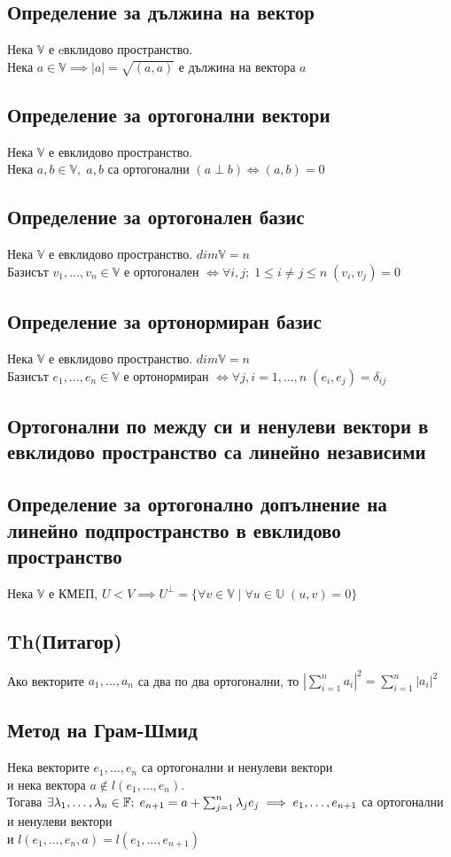 \documentclass{article}
\newcommand{\V}{\mathbb{V}}
\newcommand{\F}{\mathbb{F}}
\newcommand{\UV}{\mathbb{U}}
\newcommand{\n}[1]{#1_1, \dots, #1_n}
\newcommand{\nplusone}[1]{#1_1, \dots, #1_{n + 1}}
\newcommand{\ieqn}{i = 1, \dots, n}
\newcommand{\forallij}{\forall i, j; \; 1 \leq i \neq j \leq n}
\begin{document}
    \subsection{Определение за дължина на вектор}
    Нека \(\V\) е eвклидово пространство.\\
    Нека \(a \in \V \implies |a| = \sqrt{(a, a)}\) е дължина на вектора \(a\)
    \subsection{Определение за ортогонални вектори}
    Нека \(\V\) е евклидово пространство.\\
    Нека \(a, b \in \V, \; a, b\) са ортогонални \((a \perp b) \iff (a, b) = 0 \;\)
    \subsection{Определение за ортогонален базис}
    Нека \(\V\) е евклидово пространство. \(dim\V = n\)\\
    Базисът \(\n{v} \in \V\) е ортогонален \(\iff \forallij \; (v_i, v_j) = 0\)
    \subsection{Определение за ортонормиран базис}
    Нека \(\V\) е евклидово пространство. \(dim\V = n\)\\
    Базисът \(\n{e} \in \V\) е ортонормиран \(\iff \forall j , \ieqn \; (e_i, e_j) = \delta_{ij}\)
    \subsection{Ортогонални по между си и ненулеви вектори в евклидово пространство са линейно независими}
    \subsection{Определение за ортогонално допълнение на линейно подпространство в евклидово пространство}
    Нека \(\V\) е КМЕП, \(U < V \implies U^\perp = \{\forall v \in \V \; | \; \forall u \in \UV \; (u, v) = 0\}\)
    \subsection{Th(Питагор)}
    Ако векторите \(\n{a}\) са два по два ортогонални, то \(|\sum_{i = 1}^n a_i|^2 = \sum_{i = 1}^n |a_i|^2\)
    \subsection{Метод на Грам-Шмид}
    Нека векторите \(\n{e}\) са ортогонални и ненулеви вектори\\
    и нека вектора \(a \notin l(\n{e})\).\\
    Тогава \(\exists \n{\lambda} \in \F ; \; e_{n + 1} = a + \sum_{j = 1}^n \lambda_j e_j\\
    \implies \nplusone{e}\) са ортогонални и ненулеви вектори\\
    и \(l(\n{e}, a) = l(\nplusone{e})\)
\end{document}
